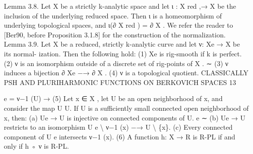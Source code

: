 \documentclass[
  10pt,
]{article}
\newenvironment{Shaded}{}{}
\newcommand{\NormalTok}[1]{#1}
\begin{document}
\begin{Shaded}
\begin{Highlighting}[]
\NormalTok{Lemma 3.8. Let X be a strictly k{-}analytic space and let ι : X red ,→ X be the inclusion of the}
\NormalTok{underlying reduced space. Then ι is a homeomorphism of underlying topological spaces, and}
\NormalTok{ι(∂ X red ) = ∂ X .}
\NormalTok{  We refer the reader to [Ber90, before Proposition 3.1.8] for the construction of the}
\NormalTok{normalization.}
\NormalTok{Lemma 3.9. Let X be a reduced, strictly k{-}analytic curve and let ν: Xe → X be its normal{-}}
\NormalTok{ization. Then the following hold:}
\NormalTok{    (1) Xe is rig{-}smooth if k is perfect.}
\NormalTok{    (2) ν is an isomorphism outside of a discrete set of rig{-}points of X .}
\NormalTok{                                     ∼}
\NormalTok{    (3) ν induces a bijection ∂ Xe −→ ∂ X .}
\NormalTok{    (4) ν is a topological quotient.}
\NormalTok{              CLASSICALLY PSH AND PLURIHARMONIC FUNCTIONS ON BERKOVICH SPACES                       13}

\NormalTok{                                                                             e = ν−1 (U) →}
\NormalTok{    (5) Let x ∈ X , let U be an open neighborhood of x, and consider the map U}
\NormalTok{        U. If U is a sufficiently small connected open neighborhood of x, then:}
\NormalTok{         (a) Ue → U is injective on connected components of U.  e}
\NormalTok{                                                                 ∼}
\NormalTok{         (b) Ue → U restricts to an isomorphism U  e \textbackslash{} ν−1 (x) −→ U \textbackslash{} \{x\}.}
\NormalTok{         (c) Every connected component of U   e intersects ν−1 (x).}
\NormalTok{    (6) A function h: X → R is R{-}PL if and only if h ◦ ν is R{-}PL.}




\end{Highlighting}
\end{Shaded}
\end{document}
